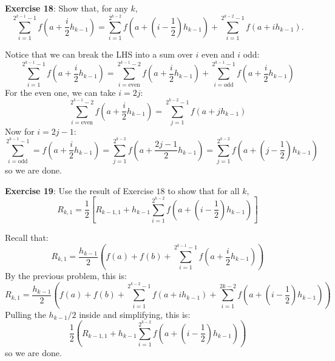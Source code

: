 \documentclass{article}
\begin{document}
\textbf{Exercise 18}: Show that, for any $k$, 
    \begin{equation*}
        \sum_{i = 1}^{2^{k - 1} - 1} f\left(a + \dfrac{i}{2}h_{k - 1}\right) = \sum_{i = 1}^{2^{k - 2}} f\left(a + \left(i  -\dfrac{1}{2}\right)h_{k - 1}\right) + \sum_{i = 1}^{2^{k - 2} - 1}f(a + ih_{k - 1}).
    \end{equation*}
    \begin{answer}
        Notice that we can break the LHS into a sum over $i$ even and $i$ odd:
            \begin{equation*}
                \sum_{i = 1}^{2^{k - 1} - 1} f\left(a + \dfrac{i}{2}h_{k - 1}\right) = \sum_{i = \text{even}}^{2^{k - 1} - 2} f\left(a + \dfrac{i}{2} h_{k - 1}\right) + \sum_{i = \text{odd}}^{2^{k - 1} - 1} f\left(a + \dfrac{i}{2}h_{k - 1}\right)
            \end{equation*}
        For the even one, we can take $i = 2j$:
            \begin{equation*}
                \sum_{i = \text{even}}^{2^{k - 1} - 2} f\left(a + \dfrac{i}{2}h_{k - 1}\right) = \sum_{j = 1}^{2^{k - 2} - 1}f(a + jh_{k - 1})
            \end{equation*}
        Now for $i = 2j - 1$:
            \begin{equation*}
                \sum_{i = \text{odd}}^{2^{k - 1} - 1} = f\left(a + \dfrac{i}{2}h_{k - 1}\right) = \sum_{j = 1}^{2^{k - 2}} f\left(a + \dfrac{2j - 1}{2}h_{k - 1}\right) = \sum_{j = 1}^{2^{k - 2}}f\left(a + \left(j - \dfrac{1}{2}\right)h_{k - 1}\right)
            \end{equation*}
        so we are done.
    \end{answer}

\textbf{Exercise 19}: Use the result of Exercise $18$ to show that for all $k$,
    \begin{equation*}
        R_{k, 1} = \dfrac{1}{2} \left[ R_{k - 1, 1} + h_{k - 1} \sum_{i = 1}^{2^{k - 2}} f\left(a + \left(i - \dfrac{1}{2}\right)h_{k - 1}\right)\right]
    \end{equation*}
    \begin{answer}
        Recall that:
            \begin{equation*}
                R_{k, 1} = \dfrac{h_{k - 1}}{2}\left(f(a) + f(b) + \sum_{i = 1}^{2^{k - 1} - 1}f\left(a + \dfrac{i}{2}h_{k - 1}\right)\right)
            \end{equation*}
        By the previous problem, this is:
            \begin{equation*}
                R_{k, 1} = \dfrac{h_{k - 1}}{2}\left(f(a) + f(b) + \sum_{i = 1}^{2^{k - 2} - 1}f(a + ih_{k - 1}) + \sum_{i = 1}^{2k - 2}f\left(a + \left(i - \dfrac{1}{2}\right)h_{k - 1}\right)\right)
            \end{equation*}
        Pulling the $h_{k - 1} / 2$ inside and simplifying, this is:
            \begin{equation*}
                \dfrac{1}{2}\left(R_{k - 1, 1} + h_{k - 1}\sum_{i = 1}^{2^{k - 2}}f\left(a + \left(i - \dfrac{1}{2}\right)h_{k - 1}\right)\right)
            \end{equation*}
        so we are done.
    \end{answer}
\end{document}
